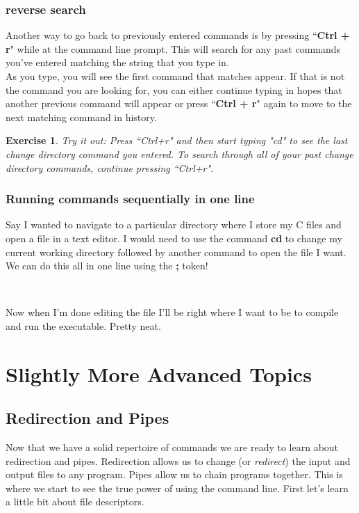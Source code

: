 \documentclass[oneside]{book}
\newcommand{\commandline}[1]{\begin{center} \colorbox{Dark}{\textcolor{white}{#1}} \end{center}}
\newtheorem{ex}{Exercise}[chapter]
\begin{document}
\subsection{reverse search}
Another way to go back to previously entered commands is by pressing ``\textbf{Ctrl + r}" while at the command line prompt.  This will search for any past commands you've entered matching the string that you type in.  \\
As you type, you will see the first command that matches appear.  If that is not the command you are looking for, you can either continue typing in hopes that another previous command will appear or press ``\textbf{Ctrl + r}" again to move to the next matching command in history.

\vspace{0.5cm}

\begin{ex}
Try it out: Press ``Ctrl+r" and then start typing "cd" to see the last change directory command you entered. To search through all of your past change directory commands, continue pressing ``Ctrl+r". 
\end{ex}

\subsection{Running commands sequentially in one line}
Say I wanted to navigate to a particular directory where I store my C files and open a file in a text editor. I would need to use the command \textbf{cd} to change my current working directory followed by another command to open the file I want. We can do this all in one line using the \textbf{;} token!
\commandline{cd demo/c\_programs ; vim HelloWorld.c}

Now when I'm done editing the file I'll be right where I want to be to compile and run the executable. Pretty neat.



\newpage

\chapter{Slightly More Advanced Topics}

\section{Redirection and Pipes}
    Now that we have a solid repertoire of commands we are ready to learn about redirection and pipes. Redirection allows us to change (or \textit{redirect}) the input and output files to any program. Pipes allow us to chain programs together. This is where we start to see the true power of using the command line. First let's learn a little bit about file descriptors. 
    
\end{document}
